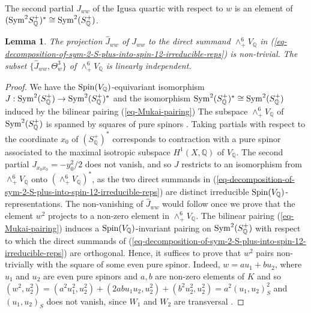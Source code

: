 \documentclass[12pt]{amsart}
\numberwithin{equation}{subsection}
\theoremstyle{plain}
\newtheorem{lem}[thm]{Lemma}
\theoremstyle{definition}
\newcommand{\QQ}{{\mathbb Q}}
\newcommand{\Spin}{{\rm Spin}}
\newcommand{\Sym}{{\rm Sym}}
\begin{document}
{The second partial $J_{ww}$ of the Igusa quartic with respect to $w$ is an element of 
$(\Sym^2S^+_\QQ)^*\cong \Sym^2(S^+_\QQ)$. 

\begin{lem}
\label{lemma-hat-J}
The projection $\hat{J}_{ww}$ of $J_{ww}$ to the direct summand $\wedge^6_+V_\QQ$ in 
(\ref{eq-decomposition-of-sym-2-S-plus-into-spin-12-irreducible-reps}) is non-trivial. 
The subset $\{\hat{J}_{ww},\Theta_w^3\}$ of $\wedge^6_+V_\QQ$ is linearly independent.
\end{lem}

\begin{proof}
We have the $\Spin(V_\QQ)$-equivariant isomorphism $J:\Sym^2(S^+_\QQ)\rightarrow \Sym^2(S^+_\QQ)^*$ and the isomorphism $\Sym^2(S^+_\QQ)^*\cong \Sym^2(S^+_\QQ)$ induced by the bilinear pairing (\ref{eq-Mukai-pairing})
The subspace $\wedge^6_+ V_\QQ$ of $\Sym^2(S^+_\QQ)$ is spanned by squares of pure spinors \cite[III.3.2 and III.4.5]{chevalley}.
Taking partials with respect to the coordinate $x_0$  of $(S^+_\QQ)^*$ 
corresponds to contraction with a pure spinor associated to the maximal isotropic subspace $H^1(X,\QQ)$ of $V_\QQ$. The second partial  $J_{x_0x_0}=-y_0^2/2$ does not vanish, and so $J$ restricts to an isomorphism
from $\wedge^6_+ V_\QQ$ onto $(\wedge^6_+ V_\QQ)^*$, as the two direct summands in 
(\ref{eq-decomposition-of-sym-2-S-plus-into-spin-12-irreducible-reps}) are distinct irreducible $\Spin(V_\QQ)$-representations. The non-vanishing of $\hat{J}_{ww}$ would follow once we 
prove that the element $w^2$  projects to a non-zero element in $\wedge^6_+ V_\QQ$.
The bilinear pairing (\ref{eq-Mukai-pairing})
induces a $\Spin(V_\QQ)$-invariant pairing on $\Sym^2(S^+_\QQ)$ with respect to which the direct summands of 
(\ref{eq-decomposition-of-sym-2-S-plus-into-spin-12-irreducible-reps}) are orthogonal. Hence, it suffices to prove that $w^2$ pairs non-trivially with the square of some even pure spinor.
Indeed, $w=au_1+bu_2$, where $u_1$ and $u_2$ are even pure spinors and $a,b$ are non-zero elements of $K$ and so $(w^2,u_2^2)=(a^2u_1^2,u_2^2)+(2abu_1u_2,u_2^2)+(b^2u_2^2,u_2^2)=a^2(u_1,u_2)_S^2$
and $(u_1,u_2)_S$ does not vanish, since $W_1$ and $W_2$ are transversal \cite[III.2.4]{chevalley}.


\end{proof}}
\end{document}
